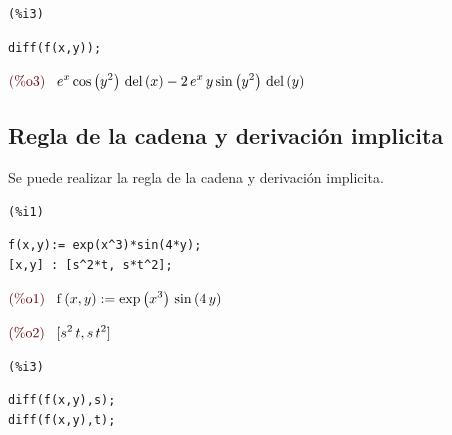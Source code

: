 \documentclass[12pt]{article}
\begin{document}
\noindent

\begin{minipage}[t]{8ex}{\color{red}\bf
\begin{verbatim}
(%i3) 
\end{verbatim}}
\end{minipage}
\begin{minipage}[t]{\textwidth}{\color{blue}
\begin{verbatim}
diff(f(x,y));
\end{verbatim}}
\end{minipage}

\begin{math}\displaystyle
\parbox{8ex}{\color{labelcolor}(\%o3) }
{e}^{x}\,\mathrm{cos}\left( {y}^{2}\right) \,\mathrm{del}\left( x\right) -2\,{e}^{x}\,y\,\mathrm{sin}\left( {y}^{2}\right) \,\mathrm{del}\left( y\right) 
\end{math}


\subsection{Regla de la cadena y derivación implicita}
Se puede realizar la regla de la cadena y derivación implicita.
\noindent

\begin{minipage}[t]{8ex}{\color{red}\bf
\begin{verbatim}
(%i1) 
\end{verbatim}}
\end{minipage}
\begin{minipage}[t]{\textwidth}{\color{blue}
\begin{verbatim}
f(x,y):= exp(x^3)*sin(4*y);
[x,y] : [s^2*t, s*t^2];
\end{verbatim}}
\end{minipage}

\begin{math}\displaystyle
\parbox{8ex}{\color{labelcolor}(\%o1) }
\mathrm{f}\left( x,y\right) :=\mathrm{exp}\left( {x}^{3}\right) \,\mathrm{sin}\left( 4\,y\right) 
\end{math}

\begin{math}\displaystyle
\parbox{8ex}{\color{labelcolor}(\%o2) }
[{s}^{2}\,t,s\,{t}^{2}]
\end{math}

\noindent

\begin{minipage}[t]{8ex}{\color{red}\bf
\begin{verbatim}
(%i3) 
\end{verbatim}}
\end{minipage}
\begin{minipage}[t]{\textwidth}{\color{blue}
\begin{verbatim}
diff(f(x,y),s);
diff(f(x,y),t);
\end{verbatim}}
\end{minipage}
\end{document}
